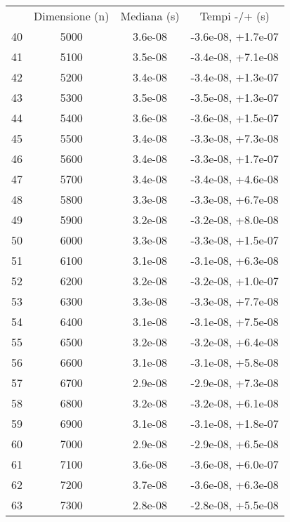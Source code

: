 \begin{table}
\centering
\begin{adjustbox}{width=1\textwidth/2}
\begin{tabular}{|c|c|c|c|}
\hline
 & Dimensione (n) & Mediana (s) & Tempi -/+ (s) \\
40 & 5000 & 3.6e-08 & -3.6e-08, +1.7e-07 \\
\cline{1-4}
41 & 5100 & 3.5e-08 & -3.4e-08, +7.1e-08 \\
\cline{1-4}
42 & 5200 & 3.4e-08 & -3.4e-08, +1.3e-07 \\
\cline{1-4}
43 & 5300 & 3.5e-08 & -3.5e-08, +1.3e-07 \\
\cline{1-4}
44 & 5400 & 3.6e-08 & -3.6e-08, +1.5e-07 \\
\cline{1-4}
45 & 5500 & 3.4e-08 & -3.3e-08, +7.3e-08 \\
\cline{1-4}
46 & 5600 & 3.4e-08 & -3.3e-08, +1.7e-07 \\
\cline{1-4}
47 & 5700 & 3.4e-08 & -3.4e-08, +4.6e-08 \\
\cline{1-4}
48 & 5800 & 3.3e-08 & -3.3e-08, +6.7e-08 \\
\cline{1-4}
49 & 5900 & 3.2e-08 & -3.2e-08, +8.0e-08 \\
\cline{1-4}
50 & 6000 & 3.3e-08 & -3.3e-08, +1.5e-07 \\
\cline{1-4}
51 & 6100 & 3.1e-08 & -3.1e-08, +6.3e-08 \\
\cline{1-4}
52 & 6200 & 3.2e-08 & -3.2e-08, +1.0e-07 \\
\cline{1-4}
53 & 6300 & 3.3e-08 & -3.3e-08, +7.7e-08 \\
\cline{1-4}
54 & 6400 & 3.1e-08 & -3.1e-08, +7.5e-08 \\
\cline{1-4}
55 & 6500 & 3.2e-08 & -3.2e-08, +6.4e-08 \\
\cline{1-4}
56 & 6600 & 3.1e-08 & -3.1e-08, +5.8e-08 \\
\cline{1-4}
57 & 6700 & 2.9e-08 & -2.9e-08, +7.3e-08 \\
\cline{1-4}
58 & 6800 & 3.2e-08 & -3.2e-08, +6.1e-08 \\
\cline{1-4}
59 & 6900 & 3.1e-08 & -3.1e-08, +1.8e-07 \\
\cline{1-4}
60 & 7000 & 2.9e-08 & -2.9e-08, +6.5e-08 \\
\cline{1-4}
61 & 7100 & 3.6e-08 & -3.6e-08, +6.0e-07 \\
\cline{1-4}
62 & 7200 & 3.7e-08 & -3.6e-08, +6.3e-08 \\
\cline{1-4}
63 & 7300 & 2.8e-08 & -2.8e-08, +5.5e-08 \\

\end{tabular}
\end{adjustbox}
\end{table}

